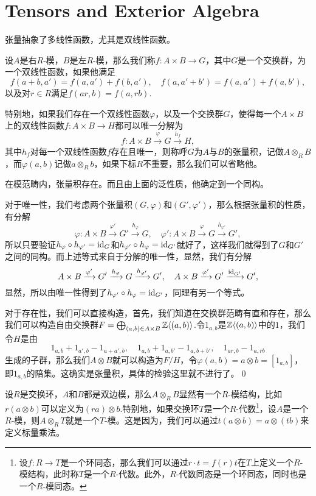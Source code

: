 \appendix
\renewcommand{\thepara}{\Alph{chapter}.\arabic{para}}
\chapter{Tensors and Exterior Algebra}

张量抽象了多线性函数，尤其是双线性函数。

\para 设$A$是右$R$-模，$B$是左$R$-模，那么我们称$f:A\times B\to G$，其中$G$是一个交换群，为一个双线性函数，如果他满足
\[
	f(a+b,a')=f(a,a')+f(b,a'),\quad f(a,a'+b')=f(a,a')+f(a,b'),
\]
以及对$r\in R$满足$f(ar,b)=f(a,rb)$.

特别地，如果我们存在一个双线性函数$\varphi$，以及一个交换群$G$，使得每一个$A\times B$上的双线性函数$f:A\times B\to H$都可以唯一分解为
\[
	f:A\times B\xrightarrow{\varphi} G\xrightarrow{h_f}H,
\]
其中$h_f$对每一个双线性函数$f$存在且唯一，则称呼$G$为$A$与$B$的张量积，记做$A\otimes_R B$，而$\varphi(a,b)$记做$a\otimes_R b$，如果下标$R$不重要，那么我们可以省略他。

\lem 在模范畴内，张量积存在。而且由上面的泛性质，他确定到一个同构。

\proof 对于唯一性，我们考虑两个张量积$(G,\varphi)$和$(G',\varphi')$，那么根据张量积的性质，有分解
\[
	\varphi:A\times B\xrightarrow{\varphi'} G'\xrightarrow{h_{\varphi}}G,\quad \varphi':A\times B\xrightarrow{\varphi} G\xrightarrow{h_{\varphi'}}G',
\]
所以只要验证$h_\varphi\circ h_{\varphi'}=\operatorname{id}_{G}$和$h_{\varphi'}\circ h_{\varphi}=\operatorname{id}_{G'}$就好了，这样我们就得到了$G$和$G'$之间的同构。而上述等式来自于分解的唯一性，显然，我们有分解
\[
	A\times B\xrightarrow{\varphi'} G'\xrightarrow{h_{\varphi}}G\xrightarrow{h_{\varphi'}}G',\quad A\times B\xrightarrow{\varphi'} G'\xrightarrow{\operatorname{id}_{G'}}G',
\]
显然，所以由唯一性得到了$h_{\varphi'}\circ h_{\varphi}=\operatorname{id}_{G'}$，同理有另一个等式。

对于存在性，我们可以直接构造，首先，我们知道在交换群范畴有直和存在，那么我们可以构造自由交换群$F=\bigoplus_{(a,b)\in A\times B} \mathbb{Z}\langle (a,b)\rangle$.令$1_{a,b}$是$\mathbb{Z}\langle (a,b)\rangle$中的$1$，我们令$H$是由
\[
	1_{a,b}+1_{a',b}-1_{a+a',b},\quad 1_{a,b}+1_{a,b'}-1_{a,b+b'},\quad 1_{ar,b}-1_{a,rb}
\]
生成的子群，那么我们$A\otimes B$就可以构造为$F/H$，令$\varphi(a,b)=a\otimes b=[1_{a,b}]$，即$1_{a,b}$的陪集。这确实是张量积，具体的检验这里就不进行了。\qed

设$R$是交换环，$A$和$B$都是双边模，那么$A\otimes_R B$显然有一个$R$-模结构，比如$r(a\otimes b)$可以定义为$(ra)\otimes b$.特别地，如果交换环$T$是一个$R$-代数\footnote{设$f:R\to T$是一个环同态，那么我们可以通过$r\cdot t=f(r)t$在$T$上定义一个$R$-模结构，此时称$T$是一个$R$-代数。此外，$R$-代数同态是一个环同态，同时也是一个$R$-模同态。}，设$A$是一个$R$-模，则$A\otimes_R T$就是一个$T$-模。这是因为，我们可以通过$t(a\otimes b)=a\otimes (tb)$来定义标量乘法。

